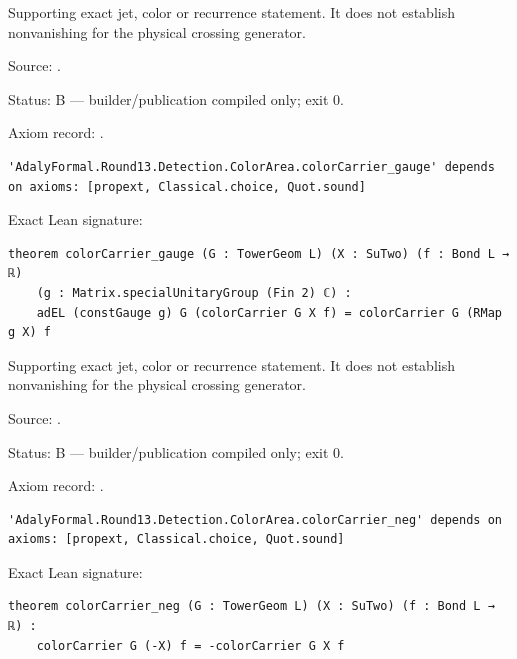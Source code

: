 \begin{theorem}[bp-520]
\label{bp-520}
\leanok
Supporting exact jet, color or recurrence statement. It does not establish nonvanishing for the physical crossing generator.

\par Source: \texttt{}.
\par Status: B — builder/publication compiled only; exit 0.
\par Axiom record: \texttt{}.
\begin{verbatim}
'AdalyFormal.Round13.Detection.ColorArea.colorCarrier_gauge' depends on axioms: [propext, Classical.choice, Quot.sound]
\end{verbatim}
\par Exact Lean signature:
\begin{verbatim}
theorem colorCarrier_gauge (G : TowerGeom L) (X : SuTwo) (f : Bond L → ℝ)
    (g : Matrix.specialUnitaryGroup (Fin 2) ℂ) :
    adEL (constGauge g) G (colorCarrier G X f) = colorCarrier G (RMap g X) f
\end{verbatim}
\end{theorem}

\begin{theorem}[bp-521]
\label{bp-521}
\leanok
Supporting exact jet, color or recurrence statement. It does not establish nonvanishing for the physical crossing generator.

\par Source: \texttt{}.
\par Status: B — builder/publication compiled only; exit 0.
\par Axiom record: \texttt{}.
\begin{verbatim}
'AdalyFormal.Round13.Detection.ColorArea.colorCarrier_neg' depends on axioms: [propext, Classical.choice, Quot.sound]
\end{verbatim}
\par Exact Lean signature:
\begin{verbatim}
theorem colorCarrier_neg (G : TowerGeom L) (X : SuTwo) (f : Bond L → ℝ) :
    colorCarrier G (-X) f = -colorCarrier G X f
\end{verbatim}
\end{theorem}

